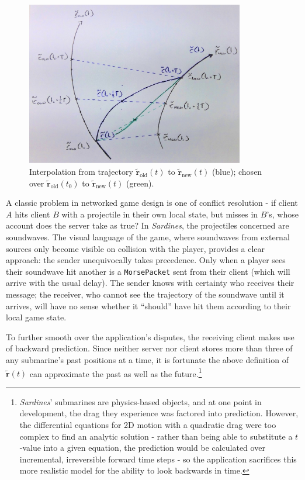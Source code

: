 \documentclass[a4paper, 9pt]{article}
\begin{document}
\begin{flushleft}
\begin{figure}[h]
\centering
\includegraphics[width=0.85\textwidth]{Interpolation}
\caption{Interpolation from trajectory $\mathbf{\tilde{r}}_{\textrm{old}}(t)$ to $\mathbf{\tilde{r}}_{\textrm{new}}(t)$ (blue); chosen over $\mathbf{\tilde{r}}_{\textrm{old}}(t_0)$ to $\mathbf{\tilde{r}}_{\textrm{new}}(t)$ (green).}
\label{Interpolation}
\end{figure}

\vspace{5pt}\noindent
A classic problem in networked game design is one of conflict resolution - if client $A$ hits client $B$ with a projectile in their own local state, but misses in $B$'s, whose account does the server take as true? In \textit{Sardines}, the projectiles concerned are soundwaves. The visual language of the game, where soundwaves from external sources only become visible on collision with the player, provides a clear approach: the sender unequivocally takes precedence. Only when a player sees their soundwave hit another is a \texttt{MorsePacket} sent from their client (which will arrive with the usual delay). The sender knows with certainty who receives their message; the receiver, who cannot see the trajectory of the soundwave until it arrives, will have no sense whether it ``should'' have hit them according to their local game state.

\vspace{5pt}\noindent
To further smooth over the application's disputes, the receiving client makes use of backward prediction. Since neither server nor client stores more than three of any submarine's past positions at a time, it is fortunate the above definition of $\mathbf{\tilde{r}}(t)$ can approximate the past as well as the future.\footnote{\textit{Sardines}' submarines are physics-based objects, and at one point in development, the drag they experience was factored into prediction. However, the differential equations for 2D motion with a quadratic drag were too complex to find an analytic solution - rather than being able to substitute a $t$-value into a given equation, the prediction would be calculated over incremental, irreversible forward time steps - so the application sacrifices this more realistic model for the ability to look backwards in time.}


\end{flushleft}
\end{document}
